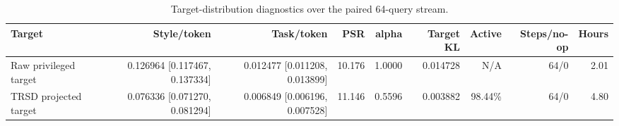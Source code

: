 \begin{table}[t]
\centering
\small
\caption{Target-distribution diagnostics over the paired 64-query stream.}
\label{tab:trsd-target}
\begin{tabular}{lrrrrrrrr}
\toprule
Target & Style/token & Task/token & PSR & alpha & Target KL & Active & Steps/no-op & Hours \\
\midrule
Raw privileged target & 0.126964 [0.117467, 0.137334] & 0.012477 [0.011208, 0.013899] & 10.176 & 1.0000 & 0.014728 & N/A & 64/0 & 2.01 \\
TRSD projected target & 0.076336 [0.071270, 0.081294] & 0.006849 [0.006196, 0.007528] & 11.146 & 0.5596 & 0.003882 & 98.44\% & 64/0 & 4.80 \\
\bottomrule
\end{tabular}
\end{table}
